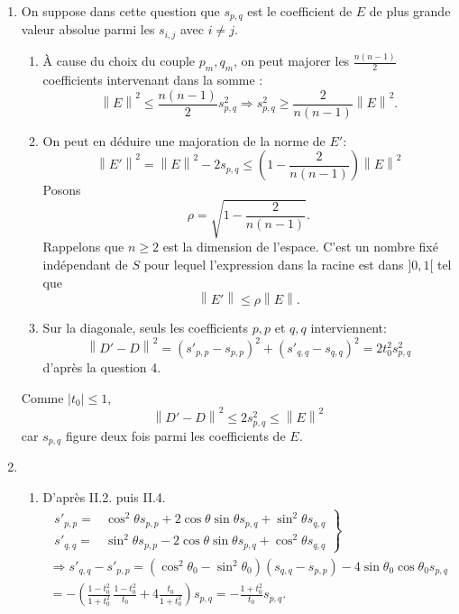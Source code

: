 \begin{enumerate}
 \item On suppose dans cette question que $s_{p,q}$ est le coefficient de $E$ de plus grande valeur absolue parmi les $s_{i,j}$ avec $i\neq j$.
\begin{enumerate}
 \item \`A cause du choix du couple $p_m,q_m$, on peut majorer les $\frac{n(n-1)}{2}$ coefficients intervenant dans la somme :
\begin{displaymath}
 \left\|E\right\|^2 \leq \frac{n(n-1)}{2} s_{p,q}^2
 \Rightarrow 
 s_{p,q}^2 \geq \frac{2}{n(n-1)}\left\|E\right\|^2
 . 
\end{displaymath}

 \item On peut en déduire une majoration de la norme de $E'$:
\begin{displaymath}
\left\|E'\right\|^2 
= \left\|E\right\|^2- 2s_{p,q} 
\leq \left( 1-\frac{2}{n(n-1)}\right)\left\|E\right\|^2 
\end{displaymath}
Posons 
\begin{displaymath}
 \rho = \sqrt{1-\frac{2}{n(n-1)}}.
\end{displaymath}
Rappelons que $n\geq2$ est la dimension de l'espace. C'est un nombre fixé indépendant de $S$ pour lequel l'expression dans la racine est dans $]0,1[$ tel que 
\begin{displaymath}
\left\|E'\right\| \leq \rho \left\|E\right\|. 
\end{displaymath}

 \item Sur la diagonale, seuls les coefficients $p,p$ et $q,q$ interviennent:
\begin{displaymath}
 \left\|D' - D\right\|^2 = (s'_{p,p} - s_{p,p})^2 + (s'_{q,q} - s_{q,q})^2
 = 2 t_0^2 s^2_{p,q}
\end{displaymath}
d'après la question 4.
\end{enumerate}
Comme $|t_0| \leq 1$,
\begin{displaymath}
 \left\|D' - D\right\|^2 \leq 2 s^2_{p,q} \leq \left\|E\right\|^2
\end{displaymath}
car $s_{p,q}$ figure deux fois parmi les coefficients de $E$.

 \item
\begin{enumerate}
 \item D'après II.2. puis II.4.
\begin{multline*}
\left. 
\begin{aligned}
 s'_{p,p} =& \cos^2\theta s_{p,p} + 2 \cos\theta \sin\theta s_{p,q} + \sin^2\theta s_{q,q} \\
 s'_{q,q} =& \sin^2\theta s_{p,p} - 2 \cos\theta \sin\theta s_{p,q} + \cos^2\theta s_{q,q}
\end{aligned}
\right\rbrace \\
\Rightarrow
s'_{q,q} - s'_{p,p}
= \left( \cos^2 \theta_0 - \sin^2 \theta_0\right)\left( s_{q,q} - s_{p,p}\right) -4 \sin\theta_0 \cos\theta_0 s_{p,q} \\
= -\left( \frac{1-t_0^2}{1+t_0^2}\,\frac{1-t_0^2}{t_0} + 4 \frac{t_0}{1+t_0^2}\right)s_{p,q} 
= - \frac{1+t_0^2}{t_0} s_{p,q}. 
\end{multline*}


\end{enumerate}
\end{enumerate}
